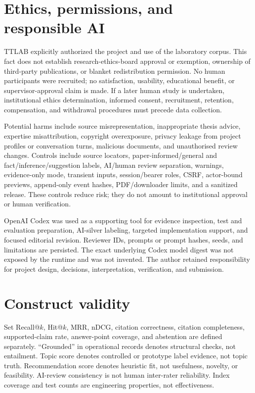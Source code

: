 \section{Ethics, permissions, and responsible AI}

TTLAB explicitly authorized the project and use of the laboratory corpus. This fact does not establish research-ethics-board approval or exemption, ownership of third-party publications, or blanket redistribution permission. No human participants were recruited; no satisfaction, usability, educational benefit, or supervisor-approval claim is made. If a later human study is undertaken, institutional ethics determination, informed consent, recruitment, retention, compensation, and withdrawal procedures must precede data collection.

Potential harms include source misrepresentation, inappropriate thesis advice, expertise misattribution, copyright overexposure, privacy leakage from project profiles or conversation turns, malicious documents, and unauthorised review changes. Controls include source locators, paper-informed/general and fact/inference/suggestion labels, AI/human review separation, warnings, evidence-only mode, transient inputs, session/bearer roles, CSRF, actor-bound previews, append-only event hashes, PDF/downloader limits, and a sanitized release. These controls reduce risk; they do not amount to institutional approval or human verification.

OpenAI Codex was used as a supporting tool for evidence inspection, test and evaluation preparation, AI-silver labeling, targeted implementation support, and focused editorial revision. Reviewer IDs, prompts or prompt hashes, seeds, and limitations are persisted. The exact underlying Codex model digest was not exposed by the runtime and was not invented. The author retained responsibility for project design, decisions, interpretation, verification, and submission.

\section{Construct validity}

Set Recall@$k$, Hit@$k$, MRR, nDCG, citation correctness, citation completeness, supported-claim rate, answer-point coverage, and abstention are defined separately. ``Grounded'' in operational records denotes structural checks, not entailment. Topic score denotes controlled or prototype label evidence, not topic truth. Recommendation score denotes heuristic fit, not usefulness, novelty, or feasibility. AI-review consistency is not human inter-rater reliability. Index coverage and test counts are engineering properties, not effectiveness.

